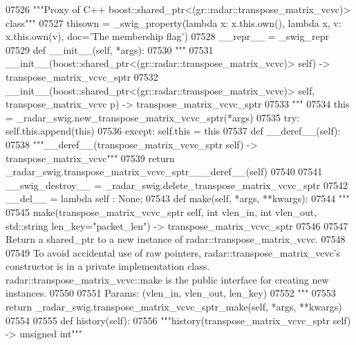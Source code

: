 \begin{DoxyCode}
{{{{{{{{{{{{{{{{{{{{{{{{{07526     \textcolor{stringliteral}{"""Proxy of C++ boost::shared\_ptr<(gr::radar::transpose\_matrix\_vcvc)> class"""}
07527     thisown = _swig_property(\textcolor{keyword}{lambda} x: x.this.own(), \textcolor{keyword}{lambda} x, v: x.this.own(v), doc=\textcolor{stringliteral}{'The membership flag'})
07528     \_\_repr\_\_ = \_swig\_repr
07529     \textcolor{keyword}{def }__init__(self, *args): 
07530         \textcolor{stringliteral}{"""}
07531 \textcolor{stringliteral}{        \_\_init\_\_(boost::shared\_ptr<(gr::radar::transpose\_matrix\_vcvc)> self) -> transpose\_matrix\_vcvc\_sptr}
07532 \textcolor{stringliteral}{        \_\_init\_\_(boost::shared\_ptr<(gr::radar::transpose\_matrix\_vcvc)> self, transpose\_matrix\_vcvc p) ->
       transpose\_matrix\_vcvc\_sptr}
07533 \textcolor{stringliteral}{        """}
07534         this = \_radar\_swig.new\_transpose\_matrix\_vcvc\_sptr(*args)
07535         \textcolor{keywordflow}{try}: self.this.append(this)
07536         \textcolor{keywordflow}{except}: self.this = this
07537     \textcolor{keyword}{def }__deref__(self):
07538         \textcolor{stringliteral}{"""\_\_deref\_\_(transpose\_matrix\_vcvc\_sptr self) -> transpose\_matrix\_vcvc"""}
07539         \textcolor{keywordflow}{return} \_radar\_swig.transpose\_matrix\_vcvc\_sptr\_\_\_deref\_\_(self)
07540 
07541     \_\_swig\_destroy\_\_ = \_radar\_swig.delete\_transpose\_matrix\_vcvc\_sptr
07542     \_\_del\_\_ = \textcolor{keyword}{lambda} self : \textcolor{keywordtype}{None};
07543     \textcolor{keyword}{def }make(self, *args, **kwargs):
07544         \textcolor{stringliteral}{"""}
07545 \textcolor{stringliteral}{        make(transpose\_matrix\_vcvc\_sptr self, int vlen\_in, int vlen\_out, std::string len\_key="packet\_len")
       -> transpose\_matrix\_vcvc\_sptr}
07546 \textcolor{stringliteral}{}
07547 \textcolor{stringliteral}{        Return a shared\_ptr to a new instance of radar::transpose\_matrix\_vcvc.}
07548 \textcolor{stringliteral}{}
07549 \textcolor{stringliteral}{        To avoid accidental use of raw pointers, radar::transpose\_matrix\_vcvc's constructor is in a private
       implementation class. radar::transpose\_matrix\_vcvc::make is the public interface for creating new
       instances.}
07550 \textcolor{stringliteral}{}
07551 \textcolor{stringliteral}{        Params: (vlen\_in, vlen\_out, len\_key)}
07552 \textcolor{stringliteral}{        """}
07553         \textcolor{keywordflow}{return} \_radar\_swig.transpose\_matrix\_vcvc\_sptr\_make(self, *args, **kwargs)
07554 
07555     \textcolor{keyword}{def }history(self):
07556         \textcolor{stringliteral}{"""history(transpose\_matrix\_vcvc\_sptr self) -> unsigned int"""}
}}}}}}}}}}}}}}}}}}}}}}}}}
\end{DoxyCode}
